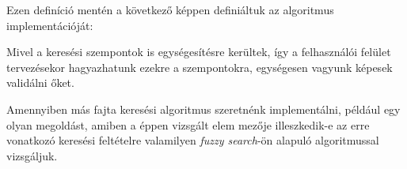 Ezen definíció mentén a következő képpen definiáltuk az algoritmus implementációját: 


Mivel a keresési szempontok is egységesítésre kerültek, így a felhasználói felület tervezésekor hagyazhatunk ezekre a szempontokra, egységesen vagyunk képesek validálni őket. \par

Amennyiben más fajta keresési algoritmus szeretnénk implementálni, például egy olyan megoldást, amiben a éppen vizsgált elem  mezője illeszkedik-e az erre vonatkozó keresési feltételre valamilyen \emph{fuzzy search}-ön \cite{hall1980approximate} alapuló algoritmussal vizsgáljuk.  


